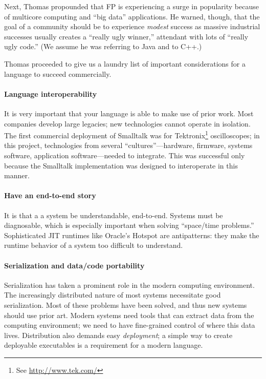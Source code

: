 \documentclass{jfp1}
\begin{document}
Next, Thomas propounded that FP is experiencing a surge in
popularity because of multicore
computing and ``big data'' applications. He warned, though, that 
the goal of a community should be to experience \textit{modest}
success as massive industrial successes usually creates a ``really ugly
winner,'' attendant with lots of ``really ugly code.'' (We assume he
was referring to Java and to C++.)

Thomas proceeded to give us a laundry list of important
considerations for a language to succeed commercially.


\paragraph{Language interoperability} It is very important that your
language is able to make use of prior work. Most companies develop
large legacies; new technologies cannot operate in isolation.
The first commercial deployment of Smalltalk was for
Tektronix\footnote{See \url{http://www.tek.com/}} oscilloscopes; in this project, technologies from several
``cultures''---hardware, firmware, systems software, application
software---needed to integrate. This was successful only because 
the Smalltalk implementation was designed to interoperate in this
manner.

\paragraph{Have an end-to-end story} It is that a
a system be understandable, end-to-end. Systems must be
diagnosable, which is especially important when solving 
``space/time problems.'' Sophisticated JIT runtimes like Oracle's Hotspot
are antipatterns: they make the runtime behavior of a system too
difficult to understand.

\paragraph{Serialization and data/code portability} Serialization has
taken a prominent role in the modern computing environment. The 
increasingly distributed nature of most systems necessitate good
serialization.  Most of these problems
have been solved, and thus new systems should use prior art. Modern systems need tools that
can extract data from the computing environment; we need to have
fine-grained control of where this data lives. Distribution also demands
easy \textit{deployment}; a simple way to create deployable executables
is a requirement for a modern language.
\end{document}
